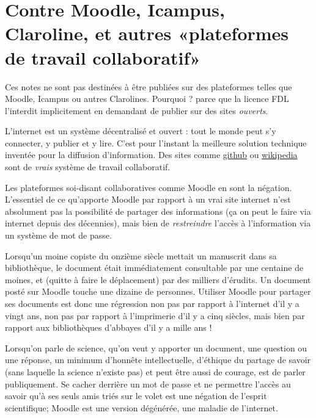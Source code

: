 

\section{Contre Moodle, Icampus, Claroline, et autres «plateformes de travail collaboratif»}

Ces notes ne sont pas destinées à être publiées sur des plateformes telles que Moodle, Icampus ou autres Clarolines. Pourquoi ? parce que la licence FDL l'interdit implicitement en demandant de publier sur des sites \emph{ouverts}.

L'internet est un système décentralisé et ouvert : tout le monde peut s'y connecter, y publier et y lire. C'est pour l'instant la meilleure solution technique inventée pour la diffusion d'information. Des sites comme \href{https://github.com}{github} ou \href{http://wikipedia.org}{wikipedia} sont de \emph{vrais} système de travail collaboratif.

Les plateformes soi-disant collaboratives comme Moodle en sont la négation. L'essentiel de ce qu'apporte Moodle par rapport à un vrai site internet n'est absolument pas la possibilité de partager des informations (ça on peut le faire via internet depuis des décennies), mais bien de \emph{restreindre} l'accès à l'information via un système de mot de passe.

Lorsqu'un moine copiste du onzième siècle mettait un manuscrit dans sa bibliothèque, le document était immédiatement consultable par une centaine de moines, et (quitte à faire le déplacement) par des milliers d'érudits. Un document posté sur Moodle touche une dizaine de personnes. Utiliser Moodle pour partager ses documents est donc une régression non pas par rapport à l'internet d'il y a vingt ans, non pas par rapport à l'imprimerie d'il y a cinq siècles, mais bien par rapport aux bibliothèques d'abbayes d'il y a mille ans !

Lorsqu'on parle de science, qu'on veut y apporter un document, une question ou une réponse, un minimum d'honnête intellectuelle, d'éthique du partage de savoir (sans laquelle la science n'existe pas) et peut être aussi de courage, est de parler publiquement. Se cacher derrière un mot de passe et ne permettre l'accès au savoir qu'à ses seuls amis triés sur le volet est une négation de l'esprit scientifique; Moodle est une version dégénérée, une maladie de l'internet.


